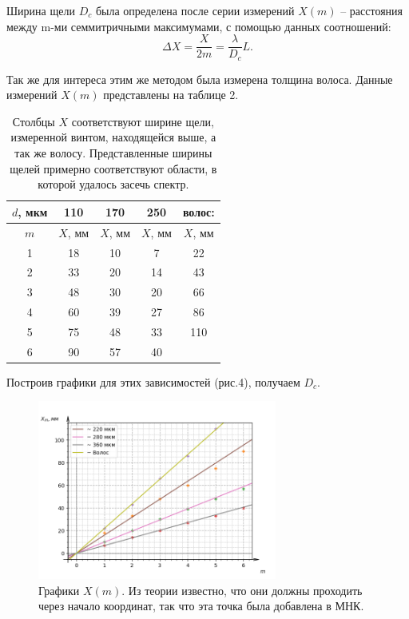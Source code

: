 \documentclass[a4paper, 14pt]{extarticle}%
\newcommand\ECaption[1]{%
     \captionsetup{font=footnotesize}%
     \caption{#1}}
\begin{document}
Ширина щели $D_c$ была определена после серии измерений $X(m)$ -- расстояния между m-ми семмитричными максимумами, с помощью данных соотношений:
\[\Delta X = \frac{X}{2m} = \frac{\lambda}{D_c}L.\]

Так же для интереса этим же методом была измерена толщина волоса. Данные измерений $X(m)$ представлены на таблице 2. 

\begin{table}[h!]
\begin{center}
\begin{tabular}{|c|c|c|c|c|}
\hline
\rowcolor[HTML]{00D2CB} 
$d$, мкм & 110     & 170     & 250     & волос:                   \\ \hline
\rowcolor[HTML]{9698ED} 
$m$      & $X$, мм & $X$, мм & $X$, мм & $X$, мм                  \\ \hline
1        & 18      & 10      & 7       & 22                       \\ \hline
\rowcolor[HTML]{9698ED} 
2        & 33      & 20      & 14      & 43                       \\ \hline
3        & 48      & 30      & 20      & 66                       \\ \hline
\rowcolor[HTML]{9698ED} 
4        & 60      & 39      & 27      & 86                       \\ \hline
5        & 75      & 48      & 33      & 110                      \\ \hline
\rowcolor[HTML]{9698ED} 
6        & 90      & 57      & 40      & \cellcolor[HTML]{00D2CB} \\ \hline
\end{tabular}
\ECaption{Столбцы $X$ соответствуют ширине щели, измеренной винтом, находящейся выше, а так же волосу. Представленные ширины щелей примерно соответствуют области, в которой удалось засечь спектр.}
\end{center}
\end{table}

Построив графики для этих зависимостей (рис.4), получаем $D_c$.
\begin{figure}[h!]
\begin{center}
\includegraphics[width=0.7\textwidth]{gr1}
\ECaption{Графики $X(m)$. Из теории известно, что они должны проходить через начало координат, так что эта точка была добавлена в МНК.}
\end{center}
\end{figure}
\end{document}

